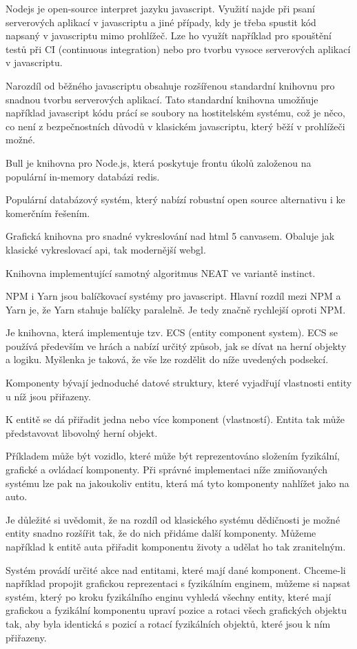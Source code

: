 Nodejs je open-source interpret jazyku javascript. Využití najde při psaní serverových aplikací v javascriptu a jiné případy, kdy je třeba spustit kód napsaný v javascriptu mimo prohlížeč. Lze ho využít například pro spouštění testů při CI (continuous integration) nebo pro tvorbu vysoce serverových aplikací v javascriptu.

Narozdíl od běžného javascriptu obsahuje rozšířenou standardní knihovnu pro snadnou tvorbu serverových aplikací. Tato standardní knihovna umožňuje například javascript kódu prácí se soubory na hostitelském systému, což je něco, co není z bezpečnostních důvodů v klasickém javascriptu, který běží v prohlížeči možné.

Bull je knihovna pro Node.js, která poskytuje frontu úkolů založenou na populární in-memory databázi redis.

Populární databázový systém, který nabízí robustní open source alternativu i ke komerčním řešením.

Grafická knihovna pro snadné vykreslování nad html 5 canvasem. Obaluje jak klasické vykreslovací api, tak modernější webgl.

Knihovna implementující samotný algoritmus NEAT ve variantě instinct.

NPM i Yarn jsou balíčkovací systémy pro javascript. Hlavní rozdíl mezi NPM a Yarn je, že Yarn stahuje balíčky paralelně. Je tedy značně rychlejší oproti NPM. 

\label{sec:ces}
Je knihovna, která implementuje tzv. ECS (entity component system). ECS se používá především ve hrách a nabízí určitý způsob, jak se dívat na herní objekty a logiku. Myšlenka je taková, že vše lze rozdělit do níže uvedených podsekcí.

Komponenty bývají jednoduché datové struktury, které vyjadřují vlastnosti entity u níž jsou přiřazeny.

K entitě se dá přiřadit jedna nebo více komponent (vlastností). Entita tak může představovat libovolný herní objekt. 

Příkladem může být vozidlo, které může být reprezentováno složením fyzikální, grafické a ovládací komponenty. Při správné implementaci níže zmiňovaných systému lze pak na jakoukoliv entitu, která má tyto komponenty nahlížet jako na auto.

Je důležité si uvědomit, že na rozdíl od klasického systému dědičnosti je možné entity snadno rozšířit tak, že do nich přidáme další komponenty. Můžeme například k entitě auta přiřadit komponentu životy a udělat ho tak zranitelným.

Systém provádí určité akce nad entitami, které mají dané komponent. Chceme-li například propojit grafickou reprezentaci s fyzikálním enginem, můžeme si napsat systém, který po kroku fyzikálního enginu vyhledá všechny entity, které mají grafickou a fyzikální komponentu upraví pozice a rotaci všech grafických objektu tak, aby byla identická s pozicí a rotací fyzikálních objektů, které jsou k ním přiřazeny.